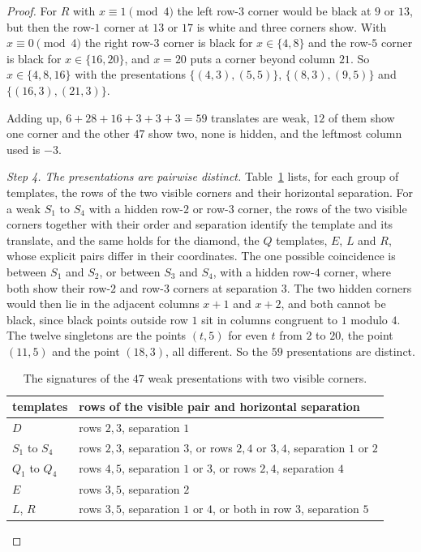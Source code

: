\begin{proof}
For $R$ with $x\equiv1\pmod4$ the left row-$3$ corner would be black at $9$ or $13$, but
then the row-$1$ corner at $13$ or $17$ is white and three corners show. With $x\equiv0\pmod4$
the right row-$3$ corner is black for $x\in\{4,8\}$ and the row-$5$ corner is black for
$x\in\{16,20\}$, and $x=20$ puts a corner beyond column $21$. So $x\in\{4,8,16\}$ with the
presentations $\{(4,3),(5,5)\}$, $\{(8,3),(9,5)\}$ and $\{(16,3),(21,3)\}$.

Adding up, $6+28+16+3+3+3=59$ translates are weak, $12$ of them show one corner and the other
$47$ show two, none is hidden, and the leftmost column used is $-3$.

\emph{Step 4. The presentations are pairwise distinct.} Table~\ref{tab:fivesignatures} lists,
for each group of templates, the rows of the two visible corners and their horizontal
separation. For a weak $S_1$ to $S_4$ with a hidden row-$2$ or row-$3$ corner, the rows of the
two visible corners together with their order and separation identify the template and its
translate, and the same holds for the diamond, the $Q$ templates, $E$, $L$ and $R$, whose
explicit pairs differ in their coordinates. The one possible coincidence is between $S_1$ and
$S_2$, or between $S_3$ and $S_4$, with a hidden row-$4$ corner, where both show their row-$2$
and row-$3$ corners at separation $3$. The two hidden corners would then lie in the adjacent
columns $x+1$ and $x+2$, and both cannot be black, since black points outside row $1$ sit in
columns congruent to $1$ modulo $4$. The twelve singletons are the points $(t,5)$ for even
$t$ from $2$ to $20$, the point $(11,5)$ and the point $(18,3)$, all different. So the $59$
presentations are distinct.

\begin{table}[t]
\centering\small
\begin{tabular}{@{}ll@{}}
\toprule
templates & rows of the visible pair and horizontal separation \\
\midrule
$D$ & rows $2,3$, separation $1$ \\
$S_1$ to $S_4$ & rows $2,3$, separation $3$, or rows $2,4$ or $3,4$, separation $1$ or $2$ \\
$Q_1$ to $Q_4$ & rows $4,5$, separation $1$ or $3$, or rows $2,4$, separation $4$ \\
$E$ & rows $3,5$, separation $2$ \\
$L$, $R$ & rows $3,5$, separation $1$ or $4$, or both in row $3$, separation $5$ \\
\bottomrule
\end{tabular}
\caption{The signatures of the $47$ weak presentations with two visible corners.}
\label{tab:fivesignatures}
\end{table}


\end{proof}

